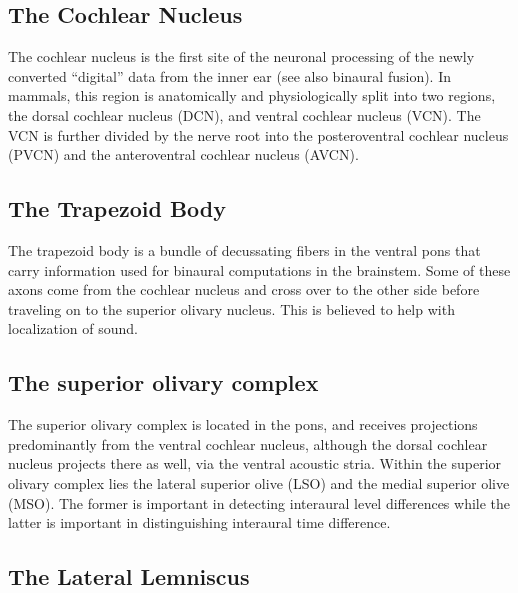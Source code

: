 \hypertarget{the-cochlear-nucleus}{%
\subsection{The Cochlear Nucleus}\label{the-cochlear-nucleus}}

The cochlear nucleus is the first site of the neuronal processing of the newly converted ``digital'' data from the inner ear (see also binaural fusion). In mammals, this region is anatomically and physiologically split into two regions, the dorsal cochlear nucleus (DCN), and ventral cochlear nucleus (VCN). The VCN is further divided by the nerve root into the posteroventral cochlear nucleus (PVCN) and the anteroventral cochlear nucleus (AVCN).

\hypertarget{the-trapezoid-body}{%
\subsection{The Trapezoid Body}\label{the-trapezoid-body}}

The trapezoid body is a bundle of decussating fibers in the ventral pons that carry information used for binaural computations in the brainstem. Some of these axons come from the cochlear nucleus and cross over to the other side before traveling on to the superior olivary nucleus. This is believed to help with localization of sound.

\hypertarget{the-superior-olivary-complex}{%
\subsection{The superior olivary complex}\label{the-superior-olivary-complex}}

The superior olivary complex is located in the pons, and receives projections predominantly from the ventral cochlear nucleus, although the dorsal cochlear nucleus projects there as well, via the ventral acoustic stria. Within the superior olivary complex lies the lateral superior olive (LSO) and the medial superior olive (MSO). The former is important in detecting interaural level differences while the latter is important in distinguishing interaural time difference.

\hypertarget{the-lateral-lemniscus}{%
\subsection{The Lateral Lemniscus}\label{the-lateral-lemniscus}}

